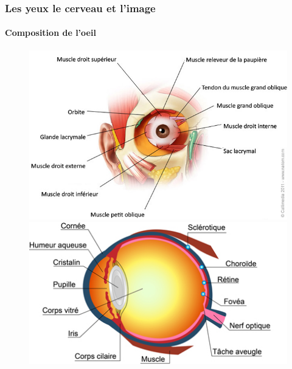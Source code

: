 \documentclass{beamer}
\begin{document}
	\begin{frame}
	\frametitle{Les yeux le cerveau et l'image}
	\framesubtitle{Composition de l'oeil}
		\begin{figure}
		   \begin{minipage}[c]{.46\linewidth}
    		   \includegraphics[scale=0.3]{oeil.jpg}
   			   \end{minipage} \hfill
		   \begin{minipage}[c]{.46\linewidth}
		      \includegraphics[scale=0.3]{schema_oeil.jpg}
   		\end{minipage}
\end{figure}
	\end{frame}
\end{document}
